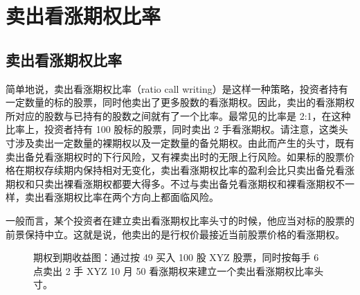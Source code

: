 \chapter{卖出看涨期权比率}
\section{卖出看涨期权比率}
简单地说，卖出看涨期权比率（ratio call writing）是这样一种策略，投资者持有一定数量的标的股票，同时他卖出了更多股数的看涨期权。因此，卖出的看涨期权所对应的股数与已持有的股数之间就有了一个比率。最常见的比率是 2:1，在这种比率上，投资者持有 100 股标的股票，同时卖出 2 手看涨期权。请注意，这类头寸涉及卖出一定数量的裸期权以及一定数量的备兑期权。由此而产生的头寸，既有卖出备兑看涨期权时的下行风险，又有裸卖出时的无限上行风险。如果标的股票价格在期权存续期内保持相对无变化，卖出看涨期权比率的盈利会比只卖出备兑看涨期权和只卖出裸看涨期权都要大得多。不过与卖出备兑看涨期权和裸看涨期权不一样，卖出看涨期权比率在两个方向上都面临风险。

一般而言，某个投资者在建立卖出看涨期权比率头寸的时候，他应当对标的股票的前景保持中立。这就是说，他卖出的是行权价最接近当前股票价格的看涨期权。
\begin{figure}
    \centering
    \caption{期权到期收益图：通过按 49 买入 100 股 XYZ 股票，同时按每手 6 点卖出 2 手 XYZ 10 月 50 看涨期权来建立一个卖出看涨期权比率头寸。}
\end{figure}
